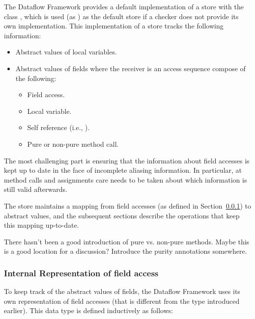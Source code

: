 The Dataflow Framework provides a default implementation of a store
with the class , which is used (as
) as the default store if a checker does not provide its
own implementation.  This implementation of a store tracks the
following information:

\begin{itemize}
    \item Abstract values of local variables.
    \item Abstract values of fields where the receiver is an
          access sequence compose of the following:
    \begin{itemize}
    \item Field access.
    \item Local variable.
    \item Self reference (i.e., ).
    \item Pure or non-pure method call.
    \end{itemize}
\end{itemize}

The most challenging part is ensuring that the information about field
accesses is kept up to date in the face of incomplete aliasing
information.  In particular, at method calls and assignments care
needs to be taken about which information is still valid afterwards.

The store maintains a mapping from field accesses (as defined in
Section~\ref{sec:field-access}) to abstract values, and the subsequent
sections describe the operations that keep this mapping up-to-date.

\begin{workinprogress}
  There hasn't been a good introduction of pure vs. non-pure methods.
  Maybe this is a good location for a discussion?
  Introduce the purity annotations somewhere.
\end{workinprogress}


\subsubsection{Internal Representation of field access}
\label{sec:field-access}

To keep track of the abstract values of fields, the Dataflow Framework
uses its own representation of field accesses (that is different from
the  type introduced earlier).  This data type is defined
inductively as follows:

